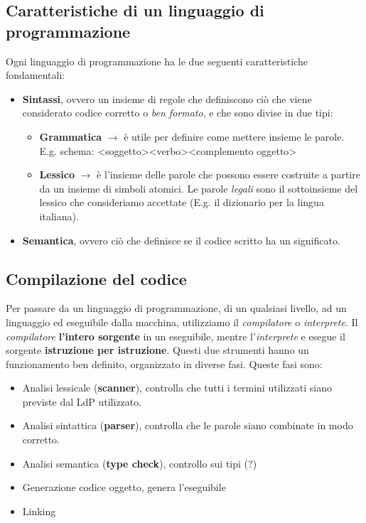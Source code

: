 \documentclass{article}
\begin{document}
\subsection*{Caratteristiche di un linguaggio di programmazione}
Ogni linguaggio di programmazione ha le due seguenti caratteristiche fondamentali:
\begin{itemize}
  \item \textbf{Sintassi}, ovvero un insieme di regole che definiscono ciò che viene considerato codice corretto o \emph{ben formato}, e che sono divise in due tipi:
        \begin{itemize}
          \item \textbf{Grammatica} \(\rightarrow\) è utile per definire come mettere insieme le parole.\\
                E.g. schema: \textless soggetto\textgreater\textless verbo\textgreater\textless complemento oggetto\textgreater
          \item \textbf{Lessico} \(\rightarrow\) è l'insieme delle parole che possono essere costruite a partire da un insieme di simboli atomici. Le parole \emph{legali} sono il sottoinsieme del lessico che consideriamo accettate (E.g. il dizionario per la lingua italiana).
        \end{itemize}
  \item \textbf{Semantica}, ovvero ciò che definisce se il codice scritto ha un significato.
\end{itemize}
\subsection*{Compilazione del codice}
Per passare da un linguaggio di programmazione, di un qualsiasi livello, ad un linguaggio  ed eseguibile dalla macchina, utilizziamo il \emph{compilatore} o \emph{interprete}. Il \emph{compilatore}  \textbf{l'intero sorgente} in un eseguibile, mentre l'\emph{interprete}  e esegue il sorgente \textbf{istruzione per istruzione}. Questi due strumenti hanno un funzionamento ben definito, organizzato in diverse fasi. Queste fasi sono:
\begin{itemize}
  \item Analisi lessicale (\textbf{scanner}), controlla che tutti i termini utilizzati siano previste dal LdP utilizzato.
  \item Analisi sintattica (\textbf{parser}), controlla che le parole siano combinate in modo corretto.
  \item Analisi semantica (\textbf{type check}), controllo sui tipi (?)
  \item Generazione codice oggetto, genera l'eseguibile
  \item Linking
\end{itemize}
\end{document}
